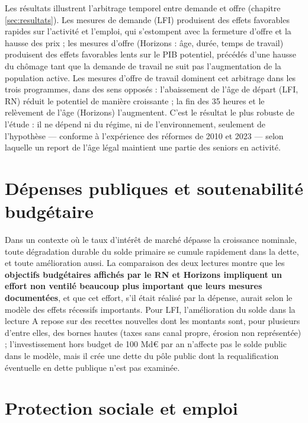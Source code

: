 \documentclass[
  11pt,
  11pt,
  a4paper,
  openany]{book}
\begin{document}
Les résultats illustrent l'arbitrage temporel entre demande et offre
(chapitre \ref{sec:resultats}). Les mesures de demande (LFI) produisent
des effets favorables rapides sur l'activité et l'emploi, qui
s'estompent avec la fermeture d'offre et la hausse des prix ; les
mesures d'offre (Horizons : âge, durée, temps de travail) produisent des
effets favorables lents sur le PIB potentiel, précédés d'une hausse du
chômage tant que la demande de travail ne suit pas l'augmentation de la
population active. Les mesures d'offre de travail dominent cet arbitrage
dans les trois programmes, dans des sens opposés : l'abaissement de
l'âge de départ (LFI, RN) réduit le potentiel de manière croissante ; la
fin des 35 heures et le relèvement de l'âge (Horizons) l'augmentent.
C'est le résultat le plus robuste de l'étude : il ne dépend ni du
régime, ni de l'environnement, seulement de l'hypothèse --- conforme à
l'expérience des réformes de 2010 et 2023 --- selon laquelle un report
de l'âge légal maintient une partie des seniors en activité.

\hypertarget{sec:soutenabilite}{%
\section{Dépenses publiques et soutenabilité
budgétaire}\label{sec:soutenabilite}}

Dans un contexte où le taux d'intérêt de marché dépasse la croissance
nominale, toute dégradation durable du solde primaire se cumule
rapidement dans la dette, et toute amélioration aussi. La comparaison
des deux lectures montre que les \textbf{objectifs budgétaires affichés
par le RN et Horizons impliquent un effort non ventilé beaucoup plus
important que leurs mesures documentées}, et que cet effort, s'il était
réalisé par la dépense, aurait selon le modèle des effets récessifs
importants. Pour LFI, l'amélioration du solde dans la lecture A repose
sur des recettes nouvelles dont les montants sont, pour plusieurs
d'entre elles, des bornes hautes (taxes sans canal propre, érosion non
représentée) ; l'investissement hors budget de 100 Md€ par an n'affecte
pas le solde public dans le modèle, mais il crée une dette du pôle
public dont la requalification éventuelle en dette publique n'est pas
examinée.

\hypertarget{sec:protection-emploi}{%
\section{Protection sociale et emploi}\label{sec:protection-emploi}}
\end{document}
